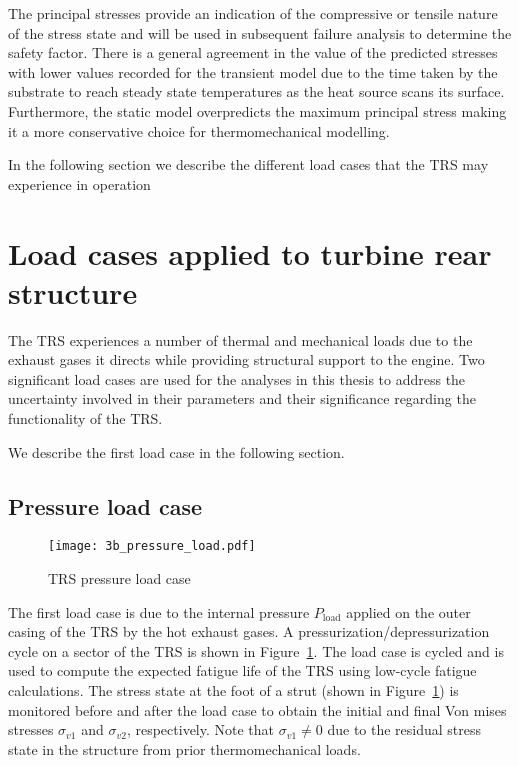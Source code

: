 The principal stresses provide an indication of the compressive or tensile nature of the stress state and will be used in subsequent failure analysis to determine the safety factor. There is a general agreement in the value of the predicted stresses with lower values recorded for the transient model due to the time taken by the substrate to reach steady state temperatures as the heat source scans its surface. Furthermore, the static model overpredicts the maximum principal stress making it a more conservative choice for thermomechanical modelling.

In the following section we describe the different load cases that the \ac{TRS} may experience in operation

\section{Load cases applied to turbine rear structure}
\label{sec:loadcases}

The \ac{TRS} experiences a number of thermal and mechanical loads due to the exhaust gases it directs while providing structural support to the engine. Two significant load cases are used for the analyses in this thesis to address the uncertainty involved in their parameters and their significance regarding the functionality of the \ac{TRS}.

We describe the first load case in the following section.

\subsection{Pressure load case} \label{subsec:iploadcase}

\begin{figure}[h!]
    \centering
    \texttt{[image: 3b\_pressure\_load.pdf]}
    \caption{ \label{fig:ipload} \ac{TRS} pressure load case }
\end{figure}

The first load case is due to the internal pressure $P_{\textrm{load}}$ applied on the outer casing of the \ac{TRS} by the hot exhaust gases. A pressurization/depressurization cycle on a sector of the \ac{TRS} is shown in Figure~\ref{fig:ipload}. The load case is cycled and is used to compute the expected fatigue life of the \ac{TRS} using low-cycle fatigue calculations. The stress state at the foot of a strut (shown in Figure~\ref{fig:ipload}) is monitored before and after the load case to obtain the initial and final Von mises stresses $\sigma_{v1}$ and $\sigma_{v2}$, respectively. Note that $\sigma_{v1} \neq 0$ due to the residual stress state in the structure from prior thermomechanical loads. 

